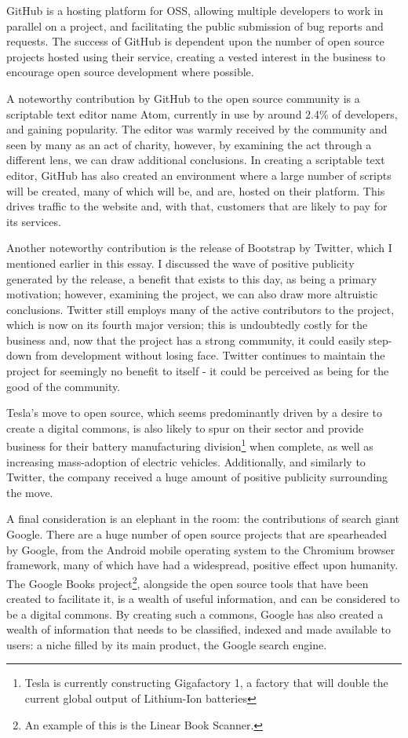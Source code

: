 \documentclass[a4paper]{article}
\begin{document}
GitHub is a hosting platform for OSS, allowing multiple developers to work in parallel on a project, and facilitating the public submission of bug reports and requests. The success of GitHub is dependent upon the number of open source projects hosted using their service, creating a vested interest in the business to encourage open source development where possible. 

A noteworthy contribution by GitHub to the open source community is a scriptable text editor name Atom, currently in use by around 2.4\% of developers\cite{editorusage}, and gaining popularity. The editor was warmly received by the community and seen by many as an act of charity, however, by examining the act through a different lens, we can draw additional conclusions. In creating  a scriptable text editor, GitHub has also created an environment where a large number of scripts will be created, many of which will be, and are, hosted on their platform. This drives traffic to the website and, with that, customers that are likely to pay for its services.

Another noteworthy contribution is the release of Bootstrap by Twitter, which I mentioned earlier in this essay. I discussed the wave of positive publicity generated by the release, a benefit that exists to this day, as being a primary motivation; however, examining the project, we can also draw more altruistic conclusions. Twitter still employs many of the active contributors to the project\cite{bootstrapcontrib}, which is now on its fourth major version; this is undoubtedly costly for the business and, now that the project has a strong community, it could easily step-down from development without losing face. Twitter continues to maintain the project for seemingly no benefit to itself - it could be perceived as being for the good of the community.

Tesla’s move to open source, which seems predominantly driven by a desire to create a digital commons, is also likely to spur on their sector and provide business for their battery manufacturing division\footnote{Tesla is currently constructing Gigafactory 1, a factory that will double the current global output of Lithium-Ion batteries\cite{gigafactory}} when complete, as well as increasing mass-adoption of electric vehicles. Additionally, and similarly to Twitter, the company received a huge amount of positive publicity surrounding the move.

A final consideration is an elephant in the room: the contributions of search giant Google\cite{google}. There are a huge number of open source projects that are spearheaded by Google, from the Android mobile operating system\cite{android} to the Chromium browser framework\cite{chromium}, many of which have had a widespread, positive effect upon humanity. The Google Books project\footnote{An example of this is the Linear Book Scanner\cite{linearbookscanner}.}, alongside the open source tools that have been created to facilitate it, is a wealth of useful information, and can be considered to be a digital commons. By creating such a commons, Google has also created a wealth of information that needs to be classified, indexed and made available to users: a niche filled by its main product, the Google search engine.
\end{document}
